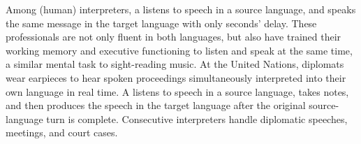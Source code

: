 

Among (human) interpreters, a  listens to speech in a source language, and speaks the same message in the target  language with only seconds' delay.  These professionals are not only fluent in both languages, but also have trained their working memory and executive functioning to listen and speak at the same time, a similar mental task to sight-reading music.   At the United Nations, diplomats wear earpieces to hear  spoken proceedings simultaneously interpreted into their own language in real time.  A  listens to speech in a source language, takes notes, and then produces the speech in the target language  after the original source-language turn is complete.  Consecutive interpreters handle diplomatic speeches, meetings, and court cases. 


